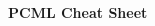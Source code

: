 \documentclass[11pt,a4paper,landscape]{article} %
\begin{document}
\raggedright
\footnotesize
\begin{multicols*}{5}

\setlength{\columnseprule}{0.25pt}
\setlength{\premulticols}{1pt}
\setlength{\postmulticols}{1pt}
\setlength{\multicolsep}{1pt}
\setlength{\columnsep}{2pt}

\begin{center}
     \small{\textbf{PCML Cheat Sheet}} \\
\end{center}

\tiny



\end{multicols*}
\end{document}
